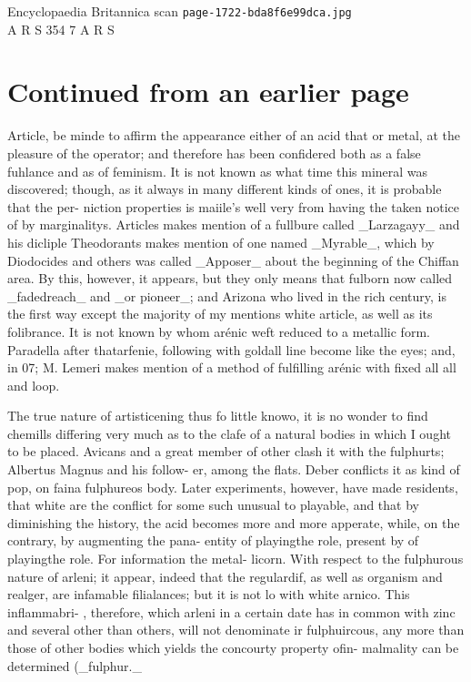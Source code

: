 \documentclass{article}
\begin{document}
\begin{center}
{\Large Encyclopaedia Britannica scan \texttt{page-1722-bda8f6e99dca.jpg}}\\[0.5em]
A R S 354 7 A R S
\end{center}
\section*{Continued from an earlier page}
Article, be minde to affirm the appearance either of an acid that or metal, at the pleasure of the operator; and therefore has been confidered both as a false fuhlance and as of feminism. It is not known as what time this mineral was discovered; though, as it always in many different kinds of ones, it is probable that the per- niction properties is maiile’s well very from having the taken notice of by marginalitys. Articles makes mention of a fullbure called \_Larzagayy\_ and his dicliple Theodorants makes mention of one named \_Myrable\_, which by Diodocides and others was called \_Apposer\_ about the beginning of the Chiffan area. By this, however, it appears, but they only means that fulborn now called \_fadedreach\_ and \_or pioneer\_; and Arizona who lived in the rich century, is the first way except the majority of my mentions white article, as well as its folibrance. It is not known by whom arénic weft reduced to a metallic form. Paradella after thatarfenie, following with goldall line become like the eyes; and, in 07; M. Lemeri makes mention of a method of fulfilling arénic with fixed all all and loop.

The true nature of artisticening thus fo little knowo, it is no wonder to find chemills differing very much as to the clafe of a natural bodies in which I ought to be placed. Avicans and a great member of other clash it with the fulphurts; Albertus Magnus and his follow- er, among the flats. Deber conflicts it as kind of pop, on faina fulphureos body. Later experiments, however, have made residents, that white are the conflict for some such unusual to playable, and that by diminishing the history, the acid becomes more and more apperate, while, on the contrary, by augmenting the pana- entity of playingthe role, present by of playingthe role. For information the metal- licorn. With respect to the fulphurous nature of arleni; it appear, indeed that the regulardif, as well as organism and realger, are infamable filialances; but it is not lo with white arnico. This inflammabri- , therefore, which arleni in a certain date has in common with zinc and several other than others, will not denominate ir fulphuircous, any more than those of other bodies which yields the concourty property ofin- malmality can be determined (\_fulphur.\_
\end{document}
